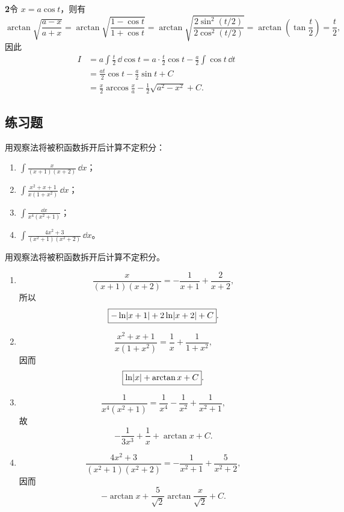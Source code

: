 \begin{xsolution}
\textbf{2}\quad 令 $x=a\cos t$，则有
\[
  \arctan\sqrt{\frac{a-x}{a+x}}
  =\arctan\sqrt{\frac{1-\cos t}{1+\cos t}}
  =\arctan\sqrt{\frac{2\sin^2(t/2)}{2\cos^2(t/2)}}
  =\arctan\left(\tan\frac t2\right)=\frac t2,
\]
因此
\begin{align*}
  I
  &=a\int\frac t2\,\dd\cos t
   =a\cdot\frac t2\cos t-\frac a2\int\cos t\,\dd t\\
  &=\frac{at}2\cos t-\frac a2\sin t+C\\
  &=\frac x2\arccos\frac xa-\frac12\sqrt{a^2-x^2}+C.
\end{align*}
\end{xsolution}

\subsection{练习题}

\begin{xexercise}[1]
用观察法将被积函数拆开后计算不定积分：
  \begin{enumerate}[label=(\arabic*)]
    \item $\displaystyle\int\frac{x}{(x+1)(x+2)}\,\dd x$；
    \item $\displaystyle\int\frac{x^2+x+1}{x(1+x^2)}\,\dd x$；
    \item $\displaystyle\int\frac{\dd x}{x^4(x^2+1)}$；
    \item $\displaystyle\int\frac{4x^2+3}{(x^2+1)(x^2+2)}\,\dd x$。
  \end{enumerate}
\end{xexercise}
\begin{xsolution}
用观察法将被积函数拆开后计算不定积分。
  \begin{enumerate}[label=(\arabic*)]
    \item
    \[
      \frac{x}{(x+1)(x+2)}=-\frac1{x+1}+\frac2{x+2},
    \]
    所以
    \[
      \boxed{-\ln\lvert x+1\rvert+2\ln\lvert x+2\rvert+C}.
    \]

    \item
    \[
      \frac{x^2+x+1}{x(1+x^2)}=\frac1x+\frac1{1+x^2},
    \]
    因而
    \[
      \boxed{\ln\lvert x\rvert+\arctan x+C}.
    \]

    \item
    \[
      \frac1{x^4(x^2+1)}=\frac1{x^4}-\frac1{x^2}+\frac1{x^2+1},
    \]
    故
    \[
      \boxed{-\frac1{3x^3}+\frac1x+\arctan x+C}.
    \]

    \item
    \[
      \frac{4x^2+3}{(x^2+1)(x^2+2)}
      =-\frac1{x^2+1}+\frac5{x^2+2},
    \]
    因而
    \[
      \boxed{-\arctan x+\frac5{\sqrt2}\arctan\frac{x}{\sqrt2}+C}.
    \]
  \end{enumerate}
\end{xsolution}


